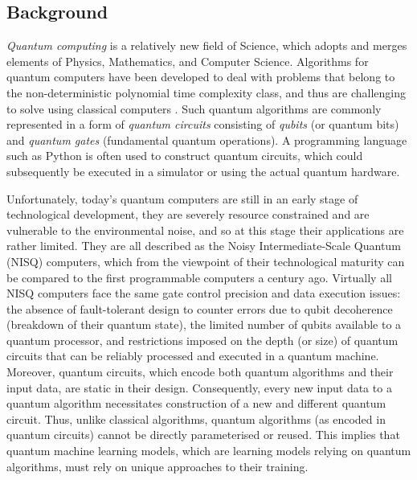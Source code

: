 \subsection{Background}\label{Sec: Background Section}
\emph{Quantum computing} is a relatively new field of Science, which adopts and merges elements of Physics, Mathematics, and Computer Science.
Algorithms for quantum computers have been developed to deal with problems that belong to the non-deterministic polynomial time complexity class, and thus are challenging to solve using classical computers \cite{williamsSolvingNPCompleteProblems2011,jiangQuantumAnnealingPrime2018,farhiQuantumApproximateOptimization2014}.
Such quantum algorithms are commonly represented in a form of \emph{quantum circuits} consisting of \emph{qubits} (or quantum bits) and \emph{quantum gates} (fundamental quantum operations). A programming language such as Python is often used to construct quantum circuits, which could subsequently be executed in a simulator or using the actual quantum hardware.


Unfortunately, today's quantum computers are still in an early stage of technological development, they are severely resource constrained and are vulnerable to the environmental noise, and so at this stage their applications are rather limited.
They are all described as the Noisy Intermediate-Scale Quantum (NISQ) \cite{brooksQuantumSupremacyHunt2019} computers, which from the viewpoint of their technological maturity can be compared to the first programmable computers a century ago.
Virtually all NISQ computers face the same gate control precision and data execution issues: the absence of fault-tolerant design to counter errors due to qubit decoherence (breakdown of their quantum state), the limited number of qubits available to a quantum processor, and restrictions imposed on the depth (or size) of quantum circuits that can be reliably processed and executed in a quantum machine.
Moreover, quantum circuits, which encode both quantum algorithms and their input data, are static in their design.
Consequently, every new input data to a quantum algorithm necessitates construction of a new and different quantum circuit.
Thus, unlike classical algorithms, quantum algorithms (as encoded in quantum circuits) cannot be directly parameterised or reused. This implies that quantum machine learning models, which are learning models relying on quantum algorithms, must rely on unique approaches to their training.

